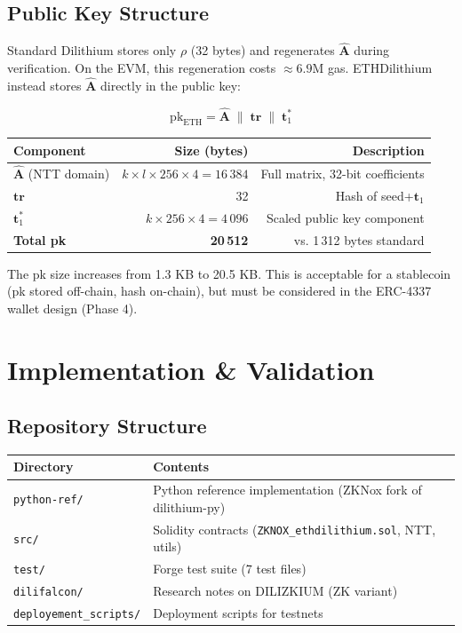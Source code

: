 \documentclass[11pt,a4paper]{article}
\begin{document}
\subsection{Public Key Structure}

Standard Dilithium stores only $\rho$ (32 bytes) and regenerates $\hat{\mathbf{A}}$ during verification. On the EVM, this regeneration costs $\approx 6.9$M gas. ETHDilithium instead stores $\hat{\mathbf{A}}$ directly in the public key:

\[
  \text{pk}_{\text{ETH}} = \hat{\mathbf{A}} \;\|\; \mathbf{tr} \;\|\; \mathbf{t}_1^*
\]

\begin{center}
\begin{tabular}{lrr}
\toprule
\textbf{Component} & \textbf{Size (bytes)} & \textbf{Description} \\
\midrule
$\hat{\mathbf{A}}$ (NTT domain) & $k \times l \times 256 \times 4 = 16\,384$ & Full matrix, 32-bit coefficients \\
$\mathbf{tr}$ & 32 & Hash of seed+$\mathbf{t}_1$ \\
$\mathbf{t}_1^*$ & $k \times 256 \times 4 = 4\,096$ & Scaled public key component \\
\midrule
\textbf{Total pk} & \textbf{20\,512} & vs. 1\,312 bytes standard \\
\bottomrule
\end{tabular}
\end{center}

\begin{warningbox}
The pk size increases from 1.3 KB to 20.5 KB. This is acceptable for a stablecoin (pk stored off-chain, hash on-chain), but must be considered in the ERC-4337 wallet design (Phase 4).
\end{warningbox}

\section{Implementation \& Validation}

\subsection{Repository Structure}

\begin{center}
\begin{tabular}{ll}
\toprule
\textbf{Directory} & \textbf{Contents} \\
\midrule
\texttt{python-ref/} & Python reference implementation (ZKNox fork of dilithium-py) \\
\texttt{src/} & Solidity contracts (\texttt{ZKNOX\_ethdilithium.sol}, NTT, utils) \\
\texttt{test/} & Forge test suite (7 test files) \\
\texttt{dilifalcon/} & Research notes on DILIZKIUM (ZK variant) \\
\texttt{deployement\_scripts/} & Deployment scripts for testnets \\
\bottomrule
\end{tabular}
\end{center}
\end{document}
